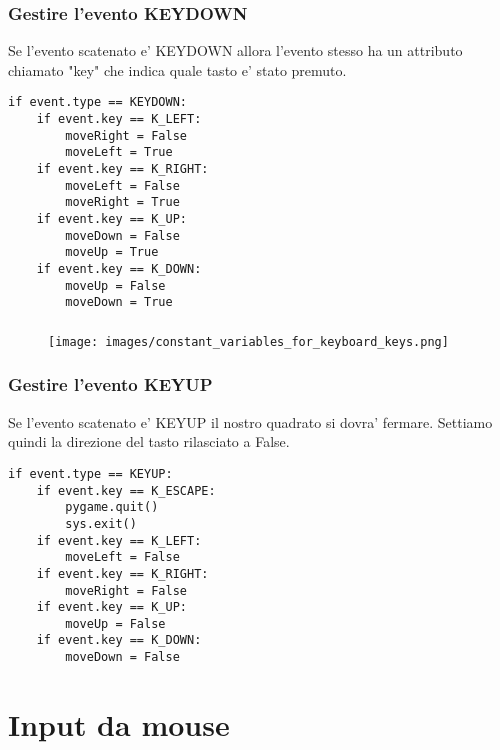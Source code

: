 \documentclass{beamer}
\begin{document}
\begin{frame}[fragile]
\frametitle{Gestire l'evento KEYDOWN}
Se l'evento scatenato e' KEYDOWN allora l'evento stesso ha un attributo chiamato "key" che indica quale tasto e' stato premuto.

\begin{lstlisting}
if event.type == KEYDOWN:
    if event.key == K_LEFT:
        moveRight = False
        moveLeft = True
    if event.key == K_RIGHT:
        moveLeft = False
        moveRight = True
    if event.key == K_UP:
        moveDown = False
        moveUp = True
    if event.key == K_DOWN:
        moveUp = False
        moveDown = True
\end{lstlisting}
    
\end{frame}

\begin{frame}{}
\frametitle{}
			\begin{figure}
   				\texttt{[image: images/constant\_variables\_for\_keyboard\_keys.png]}
			\end{figure}
\end{frame}

\begin{frame}[fragile]
\frametitle{Gestire l'evento KEYUP}
Se l'evento scatenato e' KEYUP il nostro quadrato si dovra' fermare. Settiamo quindi la direzione del tasto rilasciato a False.

\begin{lstlisting}
if event.type == KEYUP:
    if event.key == K_ESCAPE:
        pygame.quit()
        sys.exit()
    if event.key == K_LEFT:
        moveLeft = False
    if event.key == K_RIGHT:
        moveRight = False
    if event.key == K_UP:
        moveUp = False
    if event.key == K_DOWN:
        moveDown = False
\end{lstlisting}
\end{frame}

\section{Input da mouse}
\end{document}
